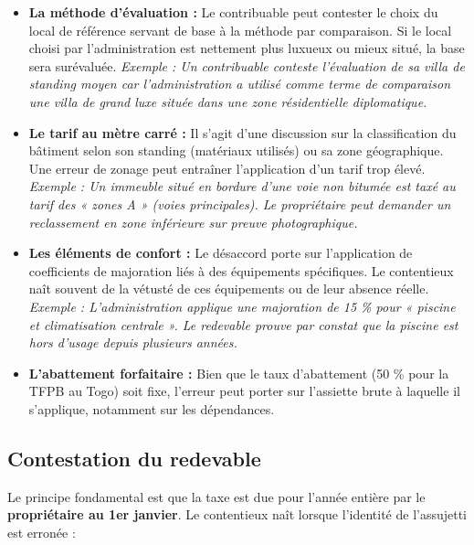 \documentclass[Cours_contentieuxTF2026.tex]{subfiles}
\begin{document}
\begin{itemize}
	\item \textbf{La méthode d'évaluation :} Le contribuable peut contester le choix du local de référence servant de base à la méthode par comparaison. Si le local choisi par l'administration est nettement plus luxueux ou mieux situé, la base sera surévaluée.
	\textit{Exemple : Un contribuable conteste l'évaluation de sa villa de standing moyen car l'administration a utilisé comme terme de comparaison une villa de grand luxe située dans une zone résidentielle diplomatique.}
	
	\item \textbf{Le tarif au mètre carré :} Il s'agit d'une discussion sur la classification du bâtiment selon son standing (matériaux utilisés) ou sa zone géographique. Une erreur de zonage peut entraîner l'application d'un tarif trop élevé.
	\textit{Exemple : Un immeuble situé en bordure d'une voie non bitumée est taxé au tarif des « zones A » (voies principales). Le propriétaire peut demander un reclassement en zone inférieure sur preuve photographique.}
	
	\item \textbf{Les éléments de confort :} Le désaccord porte sur l'application de coefficients de majoration liés à des équipements spécifiques. Le contentieux naît souvent de la vétusté de ces équipements ou de leur absence réelle.
	\textit{Exemple : L'administration applique une majoration de 15 \% pour « piscine et climatisation centrale ». Le redevable prouve par constat que la piscine est hors d'usage depuis plusieurs années.}
	
	\item \textbf{L'abattement forfaitaire :} Bien que le taux d'abattement (50 \% pour la TFPB au Togo) soit fixe, l'erreur peut porter sur l'assiette brute à laquelle il s'applique, notamment sur les dépendances.
\end{itemize}

\subsection{Contestation du redevable}
Le principe fondamental est que la taxe est due pour l'année entière par le \textbf{propriétaire au 1er janvier}. Le contentieux naît lorsque l'identité de l'assujetti est erronée :
\end{document}
